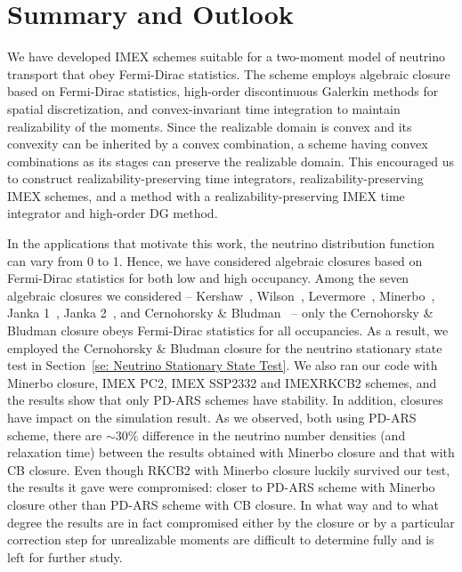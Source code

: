 \section{Summary and Outlook}\label{se:Summary}

We have developed IMEX schemes suitable for a two-moment model of neutrino transport that obey Fermi-Dirac statistics.
The scheme employs algebraic closure based on Fermi-Dirac statistics, high-order discontinuous Galerkin methods for spatial discretization, and convex-invariant time integration to maintain realizability of the moments.  
Since the realizable domain is convex and its convexity can be inherited by a convex combination, a scheme having convex combinations as its stages can preserve the realizable domain.
This encouraged us to construct realizability-preserving time integrators, realizability-preserving IMEX schemes, and a method with a realizability-preserving IMEX time integrator and high-order DG method.  

In the applications that motivate this work, the neutrino distribution function can vary from 0 to 1.  
Hence, we have considered algebraic closures based on Fermi-Dirac statistics for both low and high occupancy.  
Among the seven algebraic closures we considered -- Kershaw~\cite{kershaw_1976}, Wilson~\cite{wilson_1975,leblancWilson_1970}, Levermore~\cite{levermore_1984}, Minerbo~\cite{minerbo_1978}, Janka 1~\cite{janka_1991}, Janka 2~\cite{janka_1992}, and Cernohorsky \& Bludman~\cite{cernohorskyBludman_1994} -- only the Cernohorsky \& Bludman closure obeys Fermi-Dirac statistics for all occupancies.  
As a result, we employed the Cernohorsky \& Bludman closure for the neutrino stationary state test in Section~\ref{se: Neutrino Stationary State Test}.
We also ran our code with Minerbo closure, IMEX PC2, IMEX SSP2332 and IMEXRKCB2 schemes, and the results show that only PD-ARS schemes have stability.
In addition, closures have impact on the simulation result.
As we observed, both using PD-ARS scheme, there are $\sim30\%$ difference in the neutrino number densities (and relaxation time) between the results obtained with Minerbo closure and that with CB closure.
Even though RKCB2 with Minerbo closure luckily survived our test, the results it gave were compromised: closer to PD-ARS scheme with Minerbo closure other than PD-ARS scheme with CB closure.
In what way and to what degree the results are in fact compromised either by the closure or by a particular correction step for unrealizable moments are difficult to determine fully and is left for further study.


